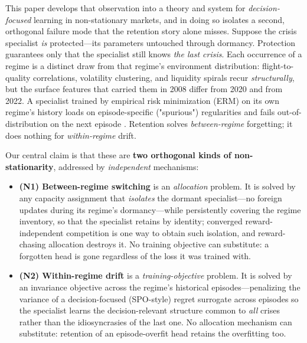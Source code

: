 \documentclass{article}
\begin{document}
This paper develops that observation into a theory and system for
\emph{decision-focused} learning in non-stationary markets, and in doing so
isolates a second, orthogonal failure mode that the retention story alone
misses. Suppose the crisis specialist \emph{is} protected---its parameters
untouched through dormancy. Protection guarantees only that the specialist
still knows \emph{the last crisis}. Each occurrence of a regime is a distinct
draw from that regime's environment distribution: flight-to-quality
correlations, volatility clustering, and liquidity spirals recur
\emph{structurally}, but the surface features that carried them in 2008
differ from 2020 and from 2022. A specialist trained by empirical risk
minimization (ERM) on its own regime's history loads on episode-specific
("spurious") regularities and fails out-of-distribution on the next episode
\citep{arjovsky2019irm, yan2026invpnco}. Retention solves \emph{between-regime}
forgetting; it does nothing for \emph{within-regime} drift.

Our central claim is that these are \textbf{two orthogonal kinds of
non-stationarity}, addressed by \emph{independent} mechanisms:

\begin{itemize}
    \item \textbf{(N1) Between-regime switching} is an \emph{allocation}
    problem. It is solved by any capacity assignment that \emph{isolates}
    the dormant specialist---no foreign updates during its regime's
    dormancy---while persistently covering the regime inventory, so that
    the specialist retains by identity; converged reward-independent
    competition is one way to obtain such isolation, and reward-chasing
    allocation destroys it. No training objective can substitute: a
    forgotten head is gone regardless of the loss it was trained with.
    \item \textbf{(N2) Within-regime drift} is a \emph{training-objective}
    problem. It is solved by an invariance objective across the regime's
    historical episodes---penalizing the variance of a decision-focused
    (SPO-style) regret surrogate across episodes so the specialist learns the
    decision-relevant structure common to \emph{all} crises rather than the
    idiosyncrasies of the last one. No allocation mechanism can substitute:
    retention of an episode-overfit head retains the overfitting too.
\end{itemize}
\end{document}
